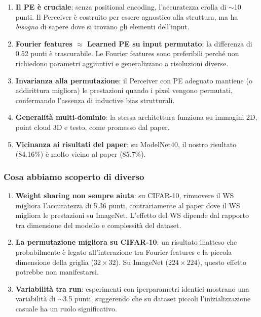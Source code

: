 \documentclass[12pt,a4paper]{article}
\begin{document}
\begin{enumerate}[label=\arabic*.]
    \item \textbf{Il PE \`e cruciale}: senza positional encoding, l'accuratezza crolla di $\sim$10 punti. Il Perceiver \`e costruito per essere agnostico alla struttura, ma ha \emph{bisogno} di sapere dove si trovano gli elementi dell'input.

    \item \textbf{Fourier features $\approx$ Learned PE su input permutato}: la differenza di 0.52 punti \`e trascurabile. Le Fourier features sono preferibili perch\'e non richiedono parametri aggiuntivi e generalizzano a risoluzioni diverse.

    \item \textbf{Invarianza alla permutazione}: il Perceiver con PE adeguato mantiene (o addirittura migliora) le prestazioni quando i pixel vengono permutati, confermando l'assenza di inductive bias strutturali.

    \item \textbf{Generalit\`a multi-dominio}: la stessa architettura funziona su immagini 2D, point cloud 3D e testo, come promesso dal paper.

    \item \textbf{Vicinanza ai risultati del paper}: su ModelNet40, il nostro risultato (84.16\%) \`e molto vicino al paper (85.7\%).
\end{enumerate}

\subsubsection{Cosa abbiamo scoperto di diverso}

\begin{enumerate}[label=\arabic*.]
    \item \textbf{Weight sharing non sempre aiuta}: su CIFAR-10, rimuovere il WS migliora l'accuratezza di 5.36 punti, contrariamente al paper dove il WS migliora le prestazioni su ImageNet. L'effetto del WS dipende dal rapporto tra dimensione del modello e complessit\`a del dataset.

    \item \textbf{La permutazione migliora su CIFAR-10}: un risultato inatteso che probabilmente \`e legato all'interazione tra Fourier features e la piccola dimensione della griglia ($32 \times 32$). Su ImageNet ($224 \times 224$), questo effetto potrebbe non manifestarsi.

    \item \textbf{Variabilit\`a tra run}: esperimenti con iperparametri identici mostrano una variabilit\`a di $\sim$3.5 punti, suggerendo che su dataset piccoli l'inizializzazione casuale ha un ruolo significativo.
\end{enumerate}
\end{document}
